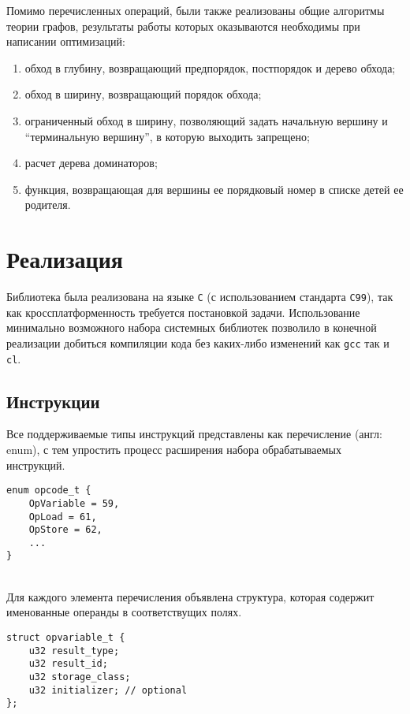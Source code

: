\documentclass[14pt]{extarticle}
\begin{document}
Помимо перечисленных операций, были также реализованы общие алгоритмы теории графов, результаты работы которых оказываются необходимы при написании оптимизаций:
\begin{enumerate}
	\item обход в глубину, возвращающий предпорядок, постпорядок и дерево обхода;
    \item обход в ширину, возвращающий порядок обхода;
    \item ограниченный обход в ширину, позволяющий задать начальную вершину и \enquote{терминальную вершину}, в которую выходить запрещено;
    \item расчет дерева доминаторов;
    \item функция, возвращающая для вершины ее порядковый номер в списке детей ее родителя.
\end{enumerate}

\newpage
\section{Реализация}
Библиотека была реализована на языке \texttt{C} (с использованием стандарта \texttt{C99}), так как кроссплатформенность требуется постановкой задачи. Использование минимально возможного набора системных библиотек позволило в конечной реализации добиться компиляции кода без каких-либо изменений как \texttt{gcc} так и \texttt{cl}.

\subsection{Инструкции}
Все поддерживаемые типы инструкций представлены как перечисление (англ: enum), с тем упростить процесс расширения набора обрабатываемых инструкций.
\begin{lstlisting}[caption={перечисление поддерживаемых типов инструкций}]
enum opcode_t {
    OpVariable = 59,
    OpLoad = 61,
    OpStore = 62,
    ...
}
\end{lstlisting}
~\\ %

Для каждого элемента перечисления объявлена структура, которая содержит именованные операнды в соответствущих полях.
\begin{lstlisting}[caption={пример структуры операндов инструкции}]
struct opvariable_t {
    u32 result_type;
    u32 result_id;
    u32 storage_class;
    u32 initializer; // optional
};
\end{lstlisting}
~\\ %
\end{document}
